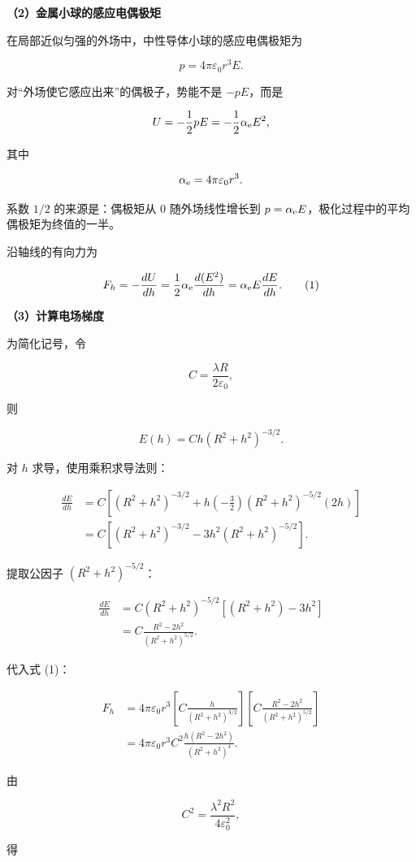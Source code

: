 \documentclass[12pt,a4paper,UTF8]{ctexart}
\begin{document}
\textbf{（2）金属小球的感应电偶极矩}

在局部近似匀强的外场中，中性导体小球的感应电偶极矩为

\[
p=4\pi\varepsilon_0r^3E.
\]

对``外场使它感应出来''的偶极子，势能不是 \(-pE\)，而是

\[
U=-\frac12pE=-\frac12\alpha_{\rm e}E^2,
\]

其中

\[
\alpha_{\rm e}=4\pi\varepsilon_0r^3.
\]

系数 \(1/2\) 的来源是：偶极矩从 0 随外场线性增长到
\(p=\alpha_{\rm e}E\)，极化过程中的平均偶极矩为终值的一半。

沿轴线的有向力为

\[
F_h=-\frac{dU}{dh}
=\frac12\alpha_{\rm e}\frac{d(E^2)}{dh}
=\alpha_{\rm e}E\frac{dE}{dh}. \tag{1}
\]

\textbf{（3）计算电场梯度}

为简化记号，令

\[
C=\frac{\lambda R}{2\varepsilon_0},
\]

则

\[
E(h)=Ch(R^2+h^2)^{-3/2}.
\]

对 \(h\) 求导，使用乘积求导法则：

\[
\begin{aligned}
\frac{dE}{dh}
&=C\left[(R^2+h^2)^{-3/2}
+h\left(-\frac32\right)(R^2+h^2)^{-5/2}(2h)\right]\\
&=C\left[(R^2+h^2)^{-3/2}
-3h^2(R^2+h^2)^{-5/2}\right].
\end{aligned}
\]

提取公因子 \((R^2+h^2)^{-5/2}\)：

\[
\begin{aligned}
\frac{dE}{dh}
&=C(R^2+h^2)^{-5/2}
\left[(R^2+h^2)-3h^2\right]\\
&=C\frac{R^2-2h^2}{(R^2+h^2)^{5/2}}.
\end{aligned}
\]

代入式 (1)：

\[
\begin{aligned}
F_h
&=4\pi\varepsilon_0r^3
\left[C\frac{h}{(R^2+h^2)^{3/2}}\right]
\left[C\frac{R^2-2h^2}{(R^2+h^2)^{5/2}}\right]\\
&=4\pi\varepsilon_0r^3C^2
\frac{h(R^2-2h^2)}{(R^2+h^2)^4}.
\end{aligned}
\]

由

\[
C^2=\frac{\lambda^2R^2}{4\varepsilon_0^2},
\]

得
\end{document}
